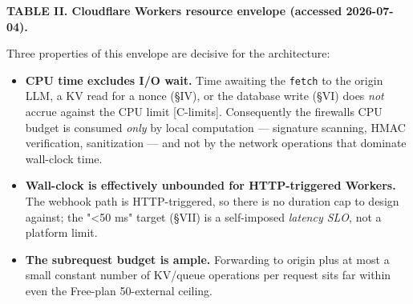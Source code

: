 \textbf{TABLE II. Cloudflare Workers resource envelope (accessed
2026-07-04).}

{\def\LTcaptype{none} %
\begin{table}[!t]\centering\scriptsize
{}
\end{table}
}

Three properties of this envelope are decisive for the architecture:

\begin{itemize}
\tightlist
\item
  \textbf{CPU time excludes I/O wait.} Time awaiting the
  \passthrough{\lstinline!fetch!} to the origin LLM, a KV read for a
  nonce (§IV), or the database write (§VI) does \emph{not} accrue
  against the CPU limit {[}C-limits{]}. Consequently the
  firewall\textquotesingle s CPU budget is consumed \emph{only} by local
  computation --- signature scanning, HMAC verification, sanitization
  --- and not by the network operations that dominate wall-clock time.
\item
  \textbf{Wall-clock is effectively unbounded for HTTP-triggered
  Workers.} The webhook path is HTTP-triggered, so there is no duration
  cap to design against; the "\textless50 ms" target (§VII) is a
  self-imposed \emph{latency SLO}, not a platform limit.
\item
  \textbf{The subrequest budget is ample.} Forwarding to origin plus at
  most a small constant number of KV/queue operations per request sits
  far within even the Free-plan 50-external ceiling.
\end{itemize}

